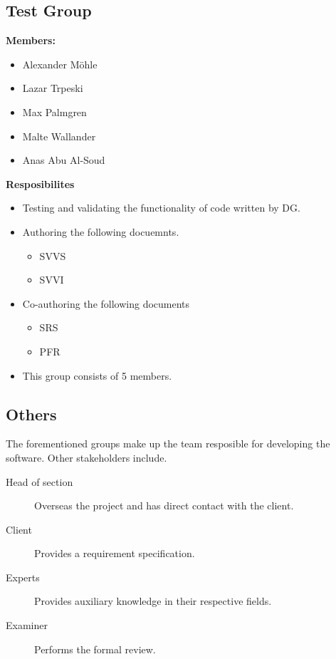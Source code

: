 \documentclass{article}
\begin{document}
    \subsection{Test Group}
        \textbf{Members: }
        \begin{itemize}
            \item Alexander Möhle
            \item Lazar Trpeski
            \item Max Palmgren
            \item Malte Wallander
            \item Anas Abu Al-Soud
        \end{itemize}
        \newpage
        \textbf{Resposibilites}
        \begin{itemize}
            \item Testing and validating the functionality of code written by DG.
            \item Authoring the following docuemnts.
            \begin{itemize}
                \item SVVS
                \item SVVI
            \end{itemize}
            \item Co-authoring the following documents
                \begin{itemize}
                    \item SRS
                    \item PFR
                \end{itemize}
            \item This group consists of 5 members.
        \end{itemize}

    \subsection{Others}
        The forementioned groups make up the team resposible for developing the software. Other stakeholders include. 
        \begin{description}
            \item [Head of section] Overseas the project and has direct contact with the client. 
            \item [Client] Provides a requirement specification.
            \item [Experts] Provides auxiliary knowledge in their respective fields. 
            \item [Examiner] Performs the formal review.
        \end{description}
\end{document}
